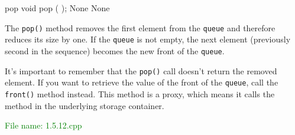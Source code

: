 \begin{methodinfo}
  {pop}
  {void pop ( );}
  {None}
  {None}
  {The \texttt{pop()} method removes the first element from the \texttt{queue} and therefore reduces 
  its size by one. If the \texttt{queue} is not empty, the next element (previously second in the sequence) 
  becomes the new front of the \texttt{queue}.

  It’s important to remember that the \texttt{pop()} call doesn’t return the removed element. If you want 
  to retrieve the value of the front of the \texttt{queue}, call the \texttt{front()} method instead. 
  This method is a proxy, which means it calls the  method in the underlying 
  storage container.}
\end{methodinfo}

\textcolor{green}{File name: 1.5.12.cpp}


